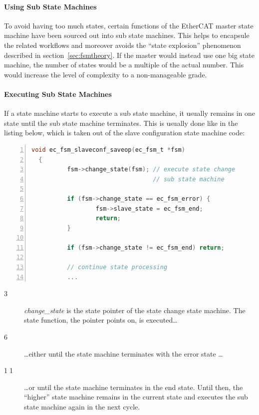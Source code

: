 \documentclass[a4paper,12pt,BCOR6mm,bibtotoc,idxtotoc]{scrbook}
\begin{document}
\paragraph{Using Sub State Machines}

To avoid having too much states, certain functions of the EtherCAT
master state machine have been sourced out into sub state machines.
This helps to encapsule the related workflows and moreover avoids the
``state explosion'' phenomenon described in
section~\ref{sec:fsmtheory}. If the master would instead use one big
state machine, the number of states would be a multiple of the actual
number. This would increase the level of complexity to a
non-manageable grade.

\paragraph{Executing Sub State Machines}

If a state machine starts to execute a sub state machine, it usually
remains in one state until the sub state machine terminates. This is
usually done like in the listing below, which is taken out of the
slave configuration state machine code:

\begin{lstlisting}[language=C,numbers=left]
  void ec_fsm_slaveconf_saveop(ec_fsm_t *fsm)
  {
          fsm->change_state(fsm); // execute state change
                                  // sub state machine

          if (fsm->change_state == ec_fsm_error) {
                  fsm->slave_state = ec_fsm_end;
                  return;
          }

          if (fsm->change_state != ec_fsm_end) return;

          // continue state processing
          ...
\end{lstlisting}

\begin{description}
\item[\normalfont\textcircled{\tiny 3}] \textit{change\_state} is the
  state pointer of the state change state machine. The state function,
  the pointer points on, is executed\ldots
\item[\normalfont\textcircled{\tiny 6}] \ldots either until the state
  machine terminates with the error state \ldots
\item[\normalfont\textcircled{\tiny 11}] \ldots or until the state
  machine terminates in the end state. Until then, the ``higher''
  state machine remains in the current state and executes the sub
  state machine again in the next cycle.
\end{description}
\end{document}
